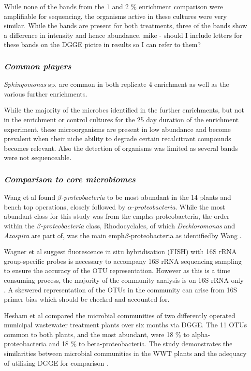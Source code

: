 \documentclass[11pt]{article}
\begin{document}
While none of the bands from the 1 and 2 \% enrichment comparison were amplifiable for sequencing, the organisms active in these cultures were very similar. While the bands are present for both treatments, three of the bands show a difference in intensity and hence abundance.
mike - should I include letters for these bands on the DGGE pictre in results so I can refer to them?

\subsubsection{\emph{Common players}}
\emph{Sphingomonas} sp. are common in both replicate 4 enrichment as well as the various further enrichments.


While the majority of the microbes identified in the further enrichments, but not in the enrichment or control cultures for the 25 day duration of the enrichment experiment, these microorganisms are present in low abundance and become prevalent when their niche ability to degrade certain recalcitrant compounds becomes relevant. Also the detection of organisms was limited as several bands were not sequenceable.

\subsubsection{\emph{Comparison to core microbiomes}}
Wang et al found \emph{$\beta$-proteobacteria} to be most abundant in the 14 plants and bench top operations, closely followed by \emph{$\alpha$-proteobacteria}. While the most abundant class for this study was from the emph{$\alpha$-proteobacteria}, the order within the \emph{$\beta$-proteobacteria} class, Rhodocyclales, of which \emph{Dechloromonas} and \emph{Azospira} are part of, was the main emph{$\beta$-proteobacteria} as identifiedby Wang \cite{wang2012pyrosequencing}.


Wagner et al suggest fluorescence in situ hybridisation (FISH) with 16S rRNA  group-specific probes is necessary to accompany 16S rRNA sequencing sampling to ensure the accuracy of the OTU representation. However as this is a time consuming process, the majority of the community analysis is on 16S rRNA only \cite{Wagner_02} . A skewered representation of the OTUs in the community can arise from 16S primer bias which should be checked and accounted for.

Hesham et al compared the microbial communities of two differently operated municipal wastewater treatment plants over six months via DGGE. The 11 OTUs common to both plants, and the most abundant, were 18 \% to alpha-proteobacteria and 18 \% to beta-proteobacteria. The study demonstrates the similarities between microbial communities in the WWT plants and the adequacy of utilising DGGE for comparison \cite{Hesham_11}.


\end{document}
